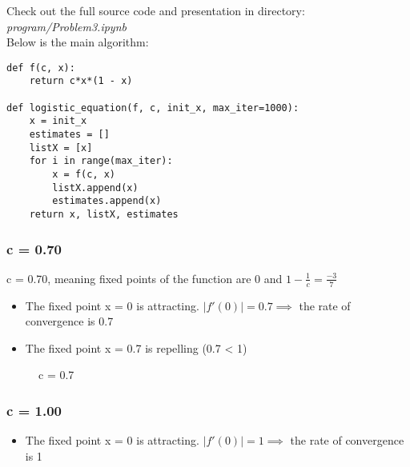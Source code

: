 Check out the full source code and presentation in directory: \textit{program/Problem3.ipynb} \\
Below is the main algorithm:
\begin{lstlisting}
def f(c, x):
    return c*x*(1 - x)

def logistic_equation(f, c, init_x, max_iter=1000):
    x = init_x
    estimates = []
    listX = [x]
    for i in range(max_iter):
        x = f(c, x)
        listX.append(x)
        estimates.append(x)
    return x, listX, estimates
\end{lstlisting}

\subsubsection{c = 0.70}
c = 0.70, meaning fixed points of the function are 0 and $1 - \frac{1}{c} = \frac{-3}{7}$

\begin{itemize}
    \item The fixed point x = 0 is attracting. $|f'(0)| = 0.7 \implies$ the rate of convergence is 0.7
    \item The fixed point x = 0.7 is repelling (0.7 < 1)
\end{itemize}

\begin{figure}[H]
\centering
{}
\caption{c = 0.7}
\end{figure}
\newpage

\subsubsection{c = 1.00}
\begin{itemize}
    \item The fixed point x = 0 is attracting. $|f'(0)| = 1 \implies$ the rate of convergence is 1
\end{itemize}

